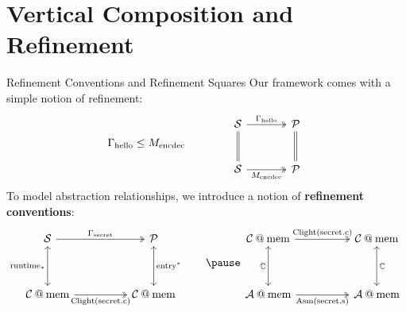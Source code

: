 \documentclass[aspectratio=1610,mathserif]{beamer}
\newcommand{\kw}[1]{\ensuremath{ \mathrm{#1} }}
\begin{document}
\section{Vertical Composition and Refinement}

\begin{frame}[fragile]{Refinement Conventions and Refinement Squares} %
Our framework comes with a simple notion of refinement:
\[
  \Gamma_\kw{hello} \le M_\kw{encdec}
  \qquad \qquad
  \begin{tikzcd}[sep=large]
    \mathcal{S} \ar[d,equal] \ar[r,"\Gamma_\kw{hello}", twoheadrightarrow] &
    \mathcal{P} \ar[d,equal] \\
    \mathcal{S} \ar[r, "M_\kw{encdec}"', twoheadrightarrow] & \mathcal{P}
  \end{tikzcd}
\]
\pause
To model abstraction relationships,
we introduce a notion of
\textbf{refinement conventions}:
\[
  \begin{tikzcd}[sep=huge]
    \mathcal{S} \ar[d,"\kw{runtime}_*"', leftrightarrow]
      \ar[r, "\Gamma_\kw{secret}", twoheadrightarrow] &
    \mathcal{P} \ar[d,"\kw{entry}^*", leftrightarrow] \\
    \mathcal{C} \mathbin@ \kw{mem} \ar[r, "\kw{Clight}(\kw{secret.c})"', twoheadrightarrow] &
    \mathcal{C} \mathbin@ \kw{mem}
  \end{tikzcd}
  \qquad \pause
  \begin{tikzcd}[sep=huge]
    \mathcal{C} \mathbin@ \kw{mem} \ar[d, "\mathbb{C}"', leftrightarrow]
      \ar[r, "\kw{Clight}(\kw{secret.c})", twoheadrightarrow] &
    \mathcal{C} \mathbin@ \kw{mem} \ar[d, "\mathbb{C}", leftrightarrow] \\
    \mathcal{A} \mathbin@ \kw{mem} \ar[r, "\kw{Asm}(\kw{secret.s})"', twoheadrightarrow] &
    \mathcal{A} \mathbin@ \kw{mem}
  \end{tikzcd}
\]
\end{frame}
\end{document}
